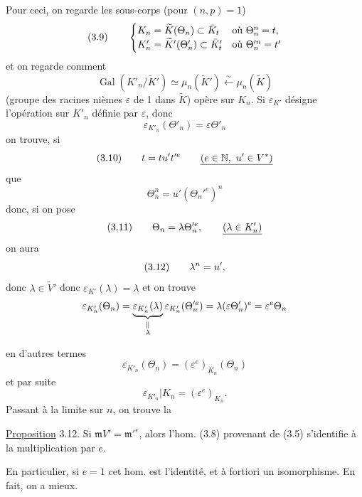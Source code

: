 Pour ceci, on regarde les sous-corps (pour $(n,p)=1$)
\[
(3.9)\qquad\begin{cases}
 K_n=\widetilde K({\Theta}_n)\subset\bar K_t&\text{où }\Theta_n^n=t,\\
 K'_n=\widetilde K'(\Theta'_n)\subset\bar K'_t&\text{où }\Theta_n'^n=t'
\end{cases}
\]
et on regarde comment
\[
\operatorname{Gal}(K'_n/\widetilde K')\simeq\mu_n(\widetilde K')\xleftarrow{\sim}\mu_n(\widetilde K)
\]
(groupe des racines nièmes $\varepsilon$ de 1 dans $\widetilde K$) opère sur $K_n$. Si $\varepsilon_{K'}$ désigne l'opération sur $K'_n$ définie par $\varepsilon$, donc
\[
\varepsilon_{K'_n}(\Theta'_n)=\varepsilon\Theta'_n
\]
on trouve, si
\[
(3.{10})\qquad t={{t}}u't'^e\qquad\underline{(e\in\mathbb N,\ u'\in V^*)}
\]
que
\[
\Theta_n^n=u'(\Theta_n'^e)^n
\]
donc, si on pose
\[
(3.{11})\qquad\Theta_n=\lambda\Theta_n'^e,\qquad\underline{(\lambda\in K'_n)}
\]
on aura
\[
{(3.{12})}\qquad\lambda^n=u',
\]
donc  $\lambda\in\widetilde V'$  donc $\varepsilon_{K'}(\lambda)=\lambda$
et on trouve
\[
\varepsilon_{K'_n}(\Theta_n)=\underbrace{\varepsilon_{K'_n}(\lambda)}_{\substack{\Vert\\\lambda}}\varepsilon_{K'_n}(\Theta_n'^e)=\lambda(\varepsilon\Theta'_n)^e={\varepsilon}^e{\Theta_n}
\]

en d'autres termes
\[
 \varepsilon_{K'_n}(\Theta_n)=(\varepsilon^e)_{K_n}(\Theta_n)
\]
et par suite
\[
 \varepsilon_{K'_n}|K_n=(\varepsilon^e)_{K_n}.
\]
Passant à la limite sur $n$, on trouve la

\uline{Proposition} 3.12. Si $\mathfrak mV'=\mathfrak m'^e$, alors l'hom.  (3.8) provenant de (3.5) s'identifie à la multiplication par $e$.

En particulier, si $e=1$ cet hom. est l'identité,  et à fortiori un isomorphisme.  En fait, on a mieux.

